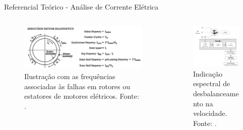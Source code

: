 \documentclass[aspectratio=169]{beamer}
\begin{document}
\begin{frame}{Referencial Teórico - Análise de Corrente Elétrica}
	\begin{columns}
    	\begin{column}{0.50\textwidth}
			\begin{figure}[HT]
				\begin{center}
					\includegraphics[scale=.35]{../referencial/img/fault_freq_randall_p55.png}
					\caption{Ilustração com as frequências associadas às falhas em rotores ou estatores de motores elétricos. \newline
					Fonte: .} 
					\label{fig:fault_freq_randall_p55}
				\end{center}
			\end{figure}
     	\end{column}
		
		\begin{column}{0.5\textwidth}
			\begin{figure}[HT]
				\begin{center}
					\includegraphics[scale=.5]{../referencial/img/current_benbouzid_p3.png}
					\caption{Indicação espectral de desbalanceamento na velocidade. \newline
					Fonte: .} 
					\label{fig:current_benbouzid_p3}
				\end{center}
			\end{figure}
	 	\end{column}
	 \end{columns}
\end{frame}
\end{document}
